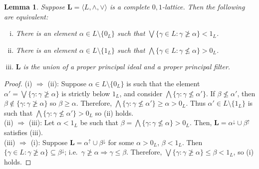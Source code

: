 \documentclass[cm,dissertation]{uhthesis}
\theoremstyle{plain}
\newtheorem{lemma}[theorem]{Lemma}
\theoremstyle{definition}
\theoremstyle{remark}
\numberwithin{theorem}{section}
\numberwithin{claim}{chapter}
\numberwithin{equation}{section}
\numberwithin{conjecture}{chapter}
\newcommand{\<}{\ensuremath{\langle}}
\renewcommand{\>}{\ensuremath{\rangle}}
\renewcommand{\leq}{\ensuremath{\leqslant}}
\renewcommand{\nleq}{\ensuremath{\nleqslant}}
\renewcommand{\geq}{\ensuremath{\geqslant}}
\renewcommand{\ngeq}{\ensuremath{\ngeqslant}}
\newcommand{\meet}{\ensuremath{\wedge}}
\newcommand{\join}{\ensuremath{\vee}}
\newcommand{\0}{\ensuremath{\mathbf{0}}}
\newcommand{\1}{\ensuremath{\mathbf{1}}}
\newcommand{\2}{\ensuremath{\mathbf{2}}}
\newcommand{\3}{\ensuremath{\mathbf{3}}}
\newcommand{\4}{\ensuremath{\mathbf{4}}}
\newcommand{\5}{\ensuremath{\mathbf{5}}}
\newcommand{\bL}{\ensuremath{\mathbf{L}}}
\newcommand{\upalpha}{\ensuremath{\alpha^{\uparrow}}}
\newcommand{\downalpha}{\ensuremath{\alpha^{\downarrow}}}
\newcommand{\upbeta}{\ensuremath{\beta^{\uparrow}}}
\newcommand{\downbeta}{\ensuremath{\beta^{\downarrow}}}
\begin{document}
\begin{lemma}
\label{Concrete-lemma-1}
Suppose $\bL = \langle L, \meet, \join\rangle$ is a complete $0,1$-lattice. Then the following
are equivalent:
\begin{enumerate}[(i)]
\item There is an element 
$\alpha \in L \setminus \{0_L\}$
such that $\bigvee\{\gamma\in L: \gamma \ngeq \alpha \} < 1_L$.
\item There is an element $\alpha \in L \setminus \{1_L\}$ such that $\bigwedge\{\gamma\in L:
  \gamma \nleq \alpha \} > 0_L$.
\item $\bL$ is the union of a proper principal ideal and a proper principal filter.
\end{enumerate}
\end{lemma}
\begin{proof}
(i) $\Rightarrow$ (ii): Suppose $\alpha \in L \setminus \{0_L\}$ is such that the element
$\alpha' = \bigvee\{\gamma: \gamma \ngeq \alpha \}$ is strictly below $1_L$, and 
consider $\bigwedge\{\gamma: \gamma \nleq \alpha'\}$.  If $\beta \nleq \alpha'$, then
$\beta \notin \{\gamma: \gamma \ngeq \alpha \}$ so $\beta \geq \alpha$.  Therefore,
$\bigwedge\{\gamma: \gamma \nleq \alpha'\}\geq \alpha > 0_L$.  Thus $\alpha'\in
L\setminus \{1_L\}$ is such that 
$\bigwedge\{\gamma: \gamma \nleq \alpha'\}> 0_L$ so (ii) holds.\\[4pt]
(ii) $\Rightarrow$ (iii): Let $\alpha < 1_L$ be such that $\beta = \bigwedge
\{\gamma: \gamma\nleq  \alpha\} > 0_L$.  
Then, $\bL = \downalpha \cup \upbeta$ satisfies (iii).\\[4pt]
(iii) $\Rightarrow$ (i): Suppose 
 $\bL = \upalpha \cup \downbeta$ for some $\alpha > 0_L$,  $\beta < 1_L$.
 Then $\{\gamma\in L: \gamma \ngeq \alpha\} \subseteq \downbeta$; 
i.e.~$\gamma \ngeq \alpha \Rightarrow \gamma \leq \beta$.  Therefore,
 $\bigvee \{\gamma: \gamma\ngeq \alpha \} \leq \beta < 1_L$, so (i) holds.
\end{proof}
\end{document}
